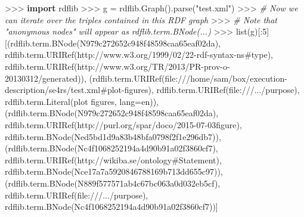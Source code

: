 \documentclass[manuscript]{acmart}
\newenvironment{Shaded}{}{}
\newcommand{\BuiltInTok}[1]{\textcolor[rgb]{0.00,0.50,0.00}{#1}}
\newcommand{\CommentTok}[1]{\textcolor[rgb]{0.38,0.63,0.69}{\textit{#1}}}
\newcommand{\DecValTok}[1]{\textcolor[rgb]{0.25,0.63,0.44}{#1}}
\newcommand{\ImportTok}[1]{\textcolor[rgb]{0.00,0.50,0.00}{\textbf{#1}}}
\newcommand{\NormalTok}[1]{#1}
\newcommand{\OperatorTok}[1]{\textcolor[rgb]{0.40,0.40,0.40}{#1}}
\newcommand{\StringTok}[1]{\textcolor[rgb]{0.25,0.44,0.63}{#1}}
\begin{document}
\begin{Shaded}
\begin{Highlighting}[]
\OperatorTok{\textgreater{}\textgreater{}\textgreater{}} \ImportTok{import}\NormalTok{ rdflib}
\OperatorTok{\textgreater{}\textgreater{}\textgreater{}}\NormalTok{ g }\OperatorTok{=}\NormalTok{ rdflib.Graph().parse(}\StringTok{"test.xml"}\NormalTok{)}
\OperatorTok{\textgreater{}\textgreater{}\textgreater{}} \CommentTok{\# Now we can iterate over the triples contained in this RDF graph}
\OperatorTok{\textgreater{}\textgreater{}\textgreater{}} \CommentTok{\# Note that "anonymous nodes" will appear as rdflib.term.BNode(\textquotesingle{}...\textquotesingle{})}
\OperatorTok{\textgreater{}\textgreater{}\textgreater{}} \BuiltInTok{list}\NormalTok{(g)[:}\DecValTok{5}\NormalTok{]}
\NormalTok{[(rdflib.term.BNode(}\StringTok{\textquotesingle{}N979c272652c948f48598caa65eaf02da\textquotesingle{}}\NormalTok{),}
\NormalTok{  rdflib.term.URIRef(}\StringTok{\textquotesingle{}http://www.w3.org/1999/02/22{-}rdf{-}syntax{-}ns\#type\textquotesingle{}}\NormalTok{),}
\NormalTok{  rdflib.term.URIRef(}\StringTok{\textquotesingle{}http://www.w3.org/TR/2013/PR{-}prov{-}o{-}20130312/generated\textquotesingle{}}\NormalTok{)),}
\NormalTok{ (rdflib.term.URIRef(}\StringTok{\textquotesingle{}file:///home/sam/box/execution{-}description/se4rs/test.xml\#plot{-}figures\textquotesingle{}}\NormalTok{),}
\NormalTok{  rdflib.term.URIRef(}\StringTok{\textquotesingle{}file:///.../purpose\textquotesingle{}}\NormalTok{),}
\NormalTok{  rdflib.term.Literal(}\StringTok{\textquotesingle{}plot figures\textquotesingle{}}\NormalTok{, lang}\OperatorTok{=}\StringTok{\textquotesingle{}en\textquotesingle{}}\NormalTok{)),}
\NormalTok{ (rdflib.term.BNode(}\StringTok{\textquotesingle{}N979c272652c948f48598caa65eaf02da\textquotesingle{}}\NormalTok{),}
\NormalTok{  rdflib.term.URIRef(}\StringTok{\textquotesingle{}http://purl.org/spar/doco/2015{-}07{-}03figure\textquotesingle{}}\NormalTok{),}
\NormalTok{  rdflib.term.BNode(}\StringTok{\textquotesingle{}Ned5bd1d9a83b48bfa0798f2f1e296db7\textquotesingle{}}\NormalTok{)),}
\NormalTok{ (rdflib.term.BNode(}\StringTok{\textquotesingle{}Nc4f1068252194a4d90b91a02f3860cf7\textquotesingle{}}\NormalTok{),}
\NormalTok{  rdflib.term.URIRef(}\StringTok{\textquotesingle{}http://wikiba.se/ontology\#Statement\textquotesingle{}}\NormalTok{),}
\NormalTok{  rdflib.term.BNode(}\StringTok{\textquotesingle{}Nce17a7a5920846788169b713dd655c97\textquotesingle{}}\NormalTok{)),}
\NormalTok{ (rdflib.term.BNode(}\StringTok{\textquotesingle{}N889f577571ab4c67bc063a0d032eb5cf\textquotesingle{}}\NormalTok{),}
\NormalTok{  rdflib.term.URIRef(}\StringTok{\textquotesingle{}file:///.../purpose\textquotesingle{}}\NormalTok{),}
\NormalTok{  rdflib.term.BNode(}\StringTok{\textquotesingle{}Nc4f1068252194a4d90b91a02f3860cf7\textquotesingle{}}\NormalTok{))]}
\end{Highlighting}
\end{Shaded}




%


\end{document}
